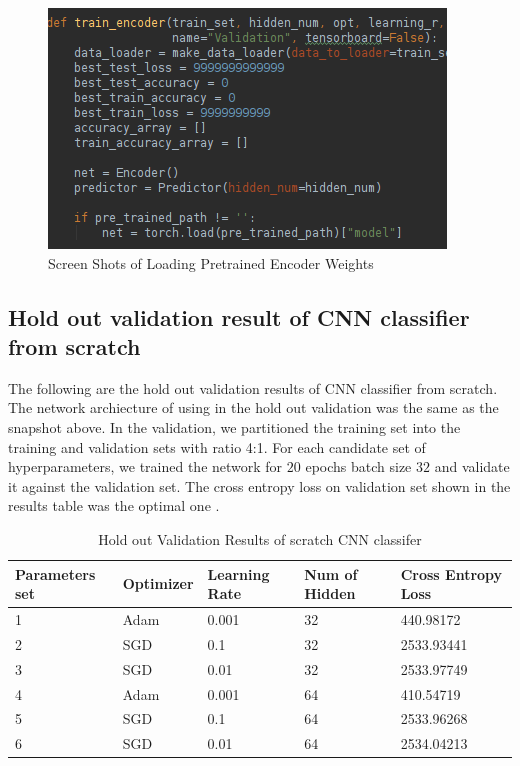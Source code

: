 \documentclass{article}
\begin{document}
\begin{figure}[h]
  \centering
  \includegraphics[scale=1]{load_model.png}
  \caption{Screen Shots of Loading Pretrained Encoder Weights}
\end{figure}

\subsection{Hold out validation result of CNN classifier from scratch}

The following are the hold out validation results of CNN classifier from scratch. The network archiecture of using in the hold out validation was the same as the snapshot above. In the validation, we partitioned the training set into the training and validation sets with ratio 4:1. For each candidate set of hyperparameters, we trained the network for $20$ epochs batch size $32$ and validate it against the validation set. The cross entropy loss on validation set shown in the results table was the optimal one .


\begin{table}[htb]
\caption{Hold out Validation Results of scratch CNN classifer}
	\label{sample-table}
	\centering
\begin{tabular}{lllll}
\toprule
		\cmidrule{1-5}
		Parameters set& Optimizer & Learning Rate & Num of Hidden & Cross Entropy Loss 		\\
		\midrule
 			1 & Adam & 0.001 & 32 & 440.98172 \\
 			2 & SGD & 0.1 & 32 &  2533.93441\\
 			3 & SGD & 0.01 & 32 & 2533.97749 \\
 			4 & Adam & 0.001 & 64 & 410.54719 \\
 			5 & SGD & 0.1 & 64 &  2533.96268\\
 			6 & SGD & 0.01 & 64 & 2534.04213 \\
\bottomrule
\end{tabular}
\end{table}
\end{document}
